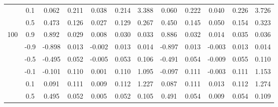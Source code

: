 \begin{table}[h]
{\begin{tabular}{|c|cccccc|ccccc|}
     & \multicolumn{1}{c|}{0.1} & \multicolumn{1}{c|}{0.062} & \multicolumn{1}{c|}{0.211} & \multicolumn{1}{c|}{0.038} & \multicolumn{1}{c|}{0.214} & 3.388 & \multicolumn{1}{c|}{0.060} & \multicolumn{1}{c|}{0.222} & \multicolumn{1}{c|}{0.040} & \multicolumn{1}{c|}{0.226} & 3.726 \\ \cline{2-12} 
     & \multicolumn{1}{c|}{0.5} & \multicolumn{1}{c|}{0.473} & \multicolumn{1}{c|}{0.126} & \multicolumn{1}{c|}{0.027} & \multicolumn{1}{c|}{0.129} & 0.267 & \multicolumn{1}{c|}{0.450} & \multicolumn{1}{c|}{0.145} & \multicolumn{1}{c|}{0.050} & \multicolumn{1}{c|}{0.154} & 0.323 \\ \cline{2-12} 
    \multirow{-6}{*}{100} & \multicolumn{1}{c|}{0.9} & \multicolumn{1}{c|}{0.892} & \multicolumn{1}{c|}{0.029} & \multicolumn{1}{c|}{0.008} & \multicolumn{1}{c|}{0.030} & 0.033 & \multicolumn{1}{c|}{0.886} & \multicolumn{1}{c|}{0.032} & \multicolumn{1}{c|}{0.014} & \multicolumn{1}{c|}{0.035} & 0.036 \\ \hline
     & \multicolumn{1}{c|}{-0.9} & \multicolumn{1}{c|}{-0.898} & \multicolumn{1}{c|}{0.013} & \multicolumn{1}{c|}{-0.002} & \multicolumn{1}{c|}{0.013} & 0.014 & \multicolumn{1}{c|}{-0.897} & \multicolumn{1}{c|}{0.013} & \multicolumn{1}{c|}{-0.003} & \multicolumn{1}{c|}{0.013} & 0.014 \\ \cline{2-12} 
     & \multicolumn{1}{c|}{-0.5} & \multicolumn{1}{c|}{-0.495} & \multicolumn{1}{c|}{0.052} & \multicolumn{1}{c|}{-0.005} & \multicolumn{1}{c|}{0.053} & 0.106 & \multicolumn{1}{c|}{-0.491} & \multicolumn{1}{c|}{0.054} & \multicolumn{1}{c|}{-0.009} & \multicolumn{1}{c|}{0.055} & 0.110 \\ \cline{2-12} 
     & \multicolumn{1}{c|}{-0.1} & \multicolumn{1}{c|}{-0.101} & \multicolumn{1}{c|}{0.110} & \multicolumn{1}{c|}{0.001} & \multicolumn{1}{c|}{0.110} & 1.095 & \multicolumn{1}{c|}{-0.097} & \multicolumn{1}{c|}{0.111} & \multicolumn{1}{c|}{-0.003} & \multicolumn{1}{c|}{0.111} & 1.153 \\ \cline{2-12} 
     & \multicolumn{1}{c|}{0.1} & \multicolumn{1}{c|}{0.091} & \multicolumn{1}{c|}{0.111} & \multicolumn{1}{c|}{0.009} & \multicolumn{1}{c|}{0.112} & 1.227 & \multicolumn{1}{c|}{0.087} & \multicolumn{1}{c|}{0.111} & \multicolumn{1}{c|}{0.013} & \multicolumn{1}{c|}{0.112} & 1.274 \\ \cline{2-12} 
     & \multicolumn{1}{c|}{0.5} & \multicolumn{1}{c|}{0.495} & \multicolumn{1}{c|}{0.052} & \multicolumn{1}{c|}{0.005} & \multicolumn{1}{c|}{0.052} & 0.105 & \multicolumn{1}{c|}{0.491} & \multicolumn{1}{c|}{0.054} & \multicolumn{1}{c|}{0.009} & \multicolumn{1}{c|}{0.054} & 0.109 \\ \cline{2-12} 

\end{tabular}}
\end{table}
